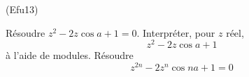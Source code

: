 \begin{tiny}(Efu13)\end{tiny} 
R{\'e}soudre $z^{2}-2z\cos a+1=0$. Interpr{\'e}ter, pour $z$
r{\'e}el,
\[
z^{2}-2z\cos a+1
\]
{\`a} l'aide de modules. R{\'e}soudre
$$z^{2n}-2z^{n}\cos na+1=0$$